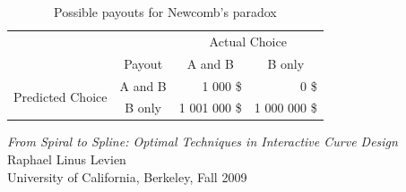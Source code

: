 \documentclass[a4paper]{article}
\begin{document}

		\begin{table}[htbp]
			\centering
			\begin{tabular}{c|c|r|r|}
				\multicolumn{1}{c}{} & \multicolumn{1}{c}{} & \multicolumn{2}{c}{Actual Choice} \\
				\cline{2-4}
				& Payout & \multicolumn{1}{|c|}{A and B} & \multicolumn{1}{|c|}{B only} \\
				\cline{2-4}
				\multirow{2}{*}{Predicted Choice} & A and B & 1 000 \$ & 0 \$ \\
				\cline{2-4}
				& B only & 1 001 000 \$ & 1 000 000 \$ \\
				\cline{2-4}
			\end{tabular}
			\caption{Possible payouts for Newcomb's paradox}
			\label{table:NewcombParadoxPayouts}
		\end{table}

	\begin{thebibliography}{}

			\emph{From Spiral to Spline: Optimal Techniques in Interactive Curve Design}\\
			Raphael Linus Levien\\
			University of California, Berkeley, Fall 2009

	\end{thebibliography}
\end{document}
